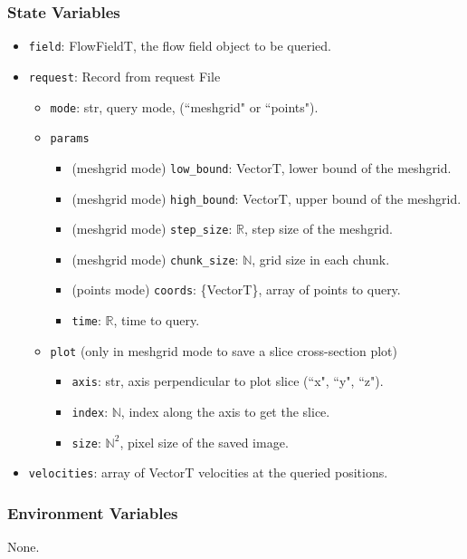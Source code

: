\documentclass[12pt, titlepage]{article}
\begin{document}
\subsubsection{State Variables}
\begin{itemize}
  \item \texttt{field}: FlowFieldT, the flow field object to be queried.
  \item \texttt{request}: Record from request File
  \begin{itemize}
    \item \texttt{mode}: str, query mode, (``meshgrid" or ``points").
    \item \texttt{params}
    \begin{itemize}
      \item (meshgrid mode) \texttt{low\_bound}: VectorT, lower bound of the meshgrid.
      \item (meshgrid mode) \texttt{high\_bound}: VectorT, upper bound of the meshgrid.
      \item (meshgrid mode) \texttt{step\_size}: $\mathbb{R}$, step size of the meshgrid.
      \item (meshgrid mode) \texttt{chunk\_size}: $\mathbb{N}$, grid size in each chunk.
      \item (points mode) \texttt{coords}: \{VectorT\}, array of points to query.
      \item \texttt{time}: $\mathbb{R}$, time to query.
    \end{itemize}
    \item \texttt{plot} (only in meshgrid mode to save a slice cross-section plot)
    \begin{itemize}
      \item \texttt{axis}: str, axis perpendicular to plot slice (``x", ``y", ``z").
      \item \texttt{index}: $\mathbb{N}$, index along the axis to get the slice.
      \item \texttt{size}: $\mathbb{N}^2$, pixel size of the saved image.
    \end{itemize}
  \end{itemize}
  \item \texttt{velocities}: array of VectorT velocities at the queried positions.
\end{itemize}

\subsubsection{Environment Variables}
None.
\end{document}
